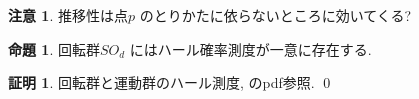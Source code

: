 \documentclass[10pt, fleqn, label-section=none]{bxjsarticle}
\theoremstyle{definition}
\newtheorem{prop}[dfn]{命題}
\newtheorem*{pf*}{証明}
\newtheorem{remark}[dfn]{注意}
\renewcommand{\;}{\, ; \,}
\begin{document}
\begin{remark}推移性は点$p$ のとりかたに依らないところに効いてくる? 

\end{remark}

\begin{prop}回転群$SO_d$ にはハール確率測度が一意に存在する.

\end{prop}
\begin{pf*}
回転群と運動群のハール測度, のpdf参照.
\qed
\end{pf*}
\end{document}
